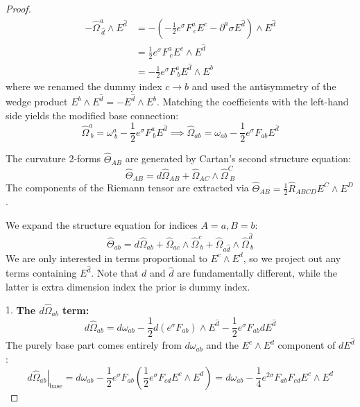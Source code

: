 \begin{tcolorbox}[breakable]
\begin{proof}
			\begin{align}
				-\hat{\Omega}^a_{\ \hat{d}} \wedge E^{\hat{d}} &= - \left( -\frac{1}{2} e^\sigma F^a_{\ c} E^c - \partial^a \sigma E^{\hat{d}} \right) \wedge E^{\hat{d}} \nonumber \\
				&= \frac{1}{2} e^\sigma F^a_{\ c} E^c \wedge E^{\hat{d}} \nonumber \\
				&= -\frac{1}{2} e^\sigma F^a_{\ b} E^{\hat{d}} \wedge E^b
			\end{align}
			where we renamed the dummy index $c \to b$ and used the antisymmetry of the wedge product $E^b \wedge E^{\hat{d}} = -E^{\hat{d}} \wedge E^b$. Matching the coefficients with the left-hand side yields the modified base connection:
			\begin{equation}
				\hat{\Omega}^a_{\ b} = \omega^a_{\ b} - \frac{1}{2} e^\sigma F^a_{\ b} E^{\hat{d}} \implies \hat{\Omega}_{ab} = \omega_{ab} - \frac{1}{2} e^\sigma F_{ab} E^{\hat{d}}
			\end{equation}
			
			The curvature 2-forms $\hat{\Theta}_{AB}$ are generated by Cartan's second structure equation:
			\begin{equation}
				\hat{\Theta}_{AB} = d\hat{\Omega}_{AB} + \hat{\Omega}_{AC} \wedge \hat{\Omega}^C_{\ B}
			\end{equation}
			The components of the Riemann tensor are extracted via $\hat{\Theta}_{AB} = \frac{1}{2} \hat{R}_{ABCD} E^C \wedge E^D$.
			
			We expand the structure equation for indices $A=a, B=b$:
			\begin{equation}
				\hat{\Theta}_{ab} = d\hat{\Omega}_{ab} + \hat{\Omega}_{ac} \wedge \hat{\Omega}^c_{\ b} + \hat{\Omega}_{a\hat{d}} \wedge \hat{\Omega}^{\hat{d}}_{\ b}
			\end{equation}
			We are only interested in terms proportional to $E^c \wedge E^d$, so we project out any terms containing $E^{\hat{d}}$. Note that $d$ and $\hat{d}$ are fundamentally different, while the latter is extra dimension index the prior is dummy index.
			
			1. \textbf{The $d\hat{\Omega}_{ab}$ term:}
			\begin{equation}
				d\hat{\Omega}_{ab} = d\omega_{ab} - \frac{1}{2} d(e^\sigma F_{ab}) \wedge E^{\hat{d}} - \frac{1}{2} e^\sigma F_{ab} dE^{\hat{d}}
			\end{equation}
			The purely base part comes entirely from $d\omega_{ab}$ and the $E^c \wedge E^d$ component of $dE^{\hat{d}}$:
			\begin{equation}
				\left. d\hat{\Omega}_{ab} \right|_{\text{base}} = d\omega_{ab} - \frac{1}{2} e^\sigma F_{ab} \left( \frac{1}{2} e^\sigma F_{cd} E^c \wedge E^d \right) = d\omega_{ab} - \frac{1}{4} e^{2\sigma} F_{ab} F_{cd} E^c \wedge E^d
			\end{equation}
			

\end{proof}
\end{tcolorbox}

